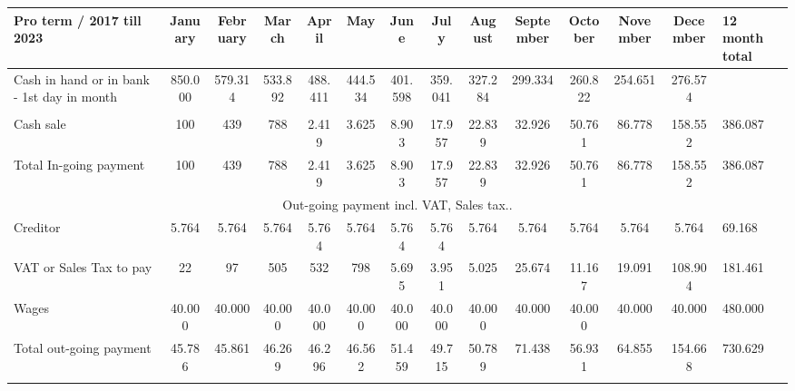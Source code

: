 \begin{tabularx}{\textwidth}{|X|c|c|c|c|c|c|c|c|c|c|c|c|X|}
\hline
\rowcolor[HTML]{9B9B9B} 
Pro term / 2017 till 2023 & January & February & March   & April   & May     & June    & July    & August  & September & October & November & December & 12 month total \\ \hline\hline
Cash in hand or in bank - 1st day in month   & 850.000 & 579.314  & 533.892 & 488.411 & 444.534 & 401.598 & 359.041 & 327.284 & 299.334   & 260.822 & 254.651  & 276.574  &                \\ \hline
\rowcolor[HTML]{9B9B9B} 
\multicolumn{14}{|c|}{\cellcolor[HTML]{9B9B9B}In-going payment incl. VAT, Sales tax ..}                                                                                                    \\ \hline
Cash sale                                    & 100     & 439      & 788     & 2.419   & 3.625   & 8.903   & 17.957  & 22.839  & 32.926    & 50.761  & 86.778   & 158.552  & 386.087        \\ \hline
\rowcolor[HTML]{9B9B9B} 
Total In-going payment                       & 100     & 439      & 788     & 2.419   & 3.625   & 8.903   & 17.957  & 22.839  & 32.926    & 50.761  & 86.778   & 158.552  & 386.087        \\ \hline
\multicolumn{14}{|c|}{Out-going payment incl. VAT, Sales tax..}                                                                                                                            \\ \hline
\rowcolor[HTML]{9B9B9B} 
Creditor                                     & 5.764   & 5.764    & 5.764   & 5.764   & 5.764   & 5.764   & 5.764   & 5.764   & 5.764     & 5.764   & 5.764    & 5.764    & 69.168         \\ \hline
VAT or Sales Tax to pay                      & 22      & 97       & 505     & 532     & 798     & 5.695   & 3.951   & 5.025   & 25.674    & 11.167  & 19.091   & 108.904  & 181.461        \\ \hline
\rowcolor[HTML]{9B9B9B} 
Wages                                        & 40.000  & 40.000   & 40.000  & 40.000  & 40.000  & 40.000  & 40.000  & 40.000  & 40.000    & 40.000  & 40.000   & 40.000   & 480.000        \\ \hline
Total out-going payment                      & 45.786  & 45.861   & 46.269  & 46.296  & 46.562  & 51.459  & 49.715  & 50.789  & 71.438    & 56.931  & 64.855   & 154.668  & 730.629        \\ \hline
\rowcolor[HTML]{9B9B9B} 

\end{tabularx}
